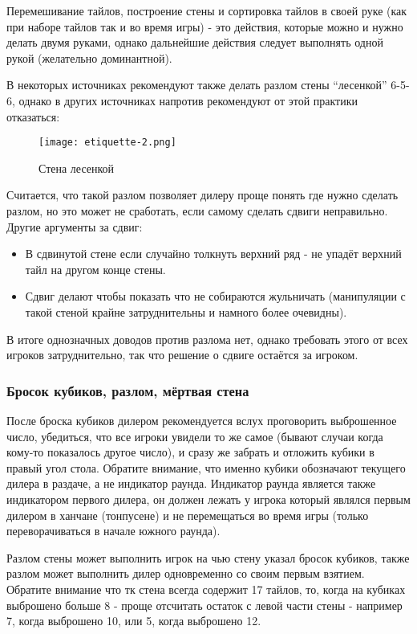 Перемешивание тайлов, построение стены и сортировка тайлов в своей руке (как при наборе тайлов так и во время игры) - это действия, которые можно и нужно делать двумя руками, однако дальнейшие действия следует выполнять одной рукой (желательно доминантной).

В некоторых источниках рекомендуют также делать разлом стены “лесенкой” 6-5-6, однако в других источниках напротив рекомендуют от этой практики отказаться:

\begin{figure}[H]
	\centering
	\texttt{[image: etiquette-2.png]}
	\caption{Стена лесенкой}
\end{figure}

Считается, что такой разлом позволяет дилеру проще понять где нужно сделать разлом, но это может не сработать, если самому сделать сдвиги неправильно. Другие аргументы за сдвиг:
\begin{itemize}
	\item В сдвинутой стене если случайно толкнуть верхний ряд - не упадёт верхний тайл на другом конце стены.
	\item Сдвиг делают чтобы показать что не собираются жульничать (манипуляции с такой стеной крайне затруднительны и намного более очевидны).
\end{itemize} 
В итоге однозначных доводов против разлома нет, однако требовать этого от всех игроков затруднительно, так что решение о сдвиге остаётся за игроком.

\subsubsection{Бросок кубиков, разлом, мёртвая стена}

После броска кубиков дилером рекомендуется вслух проговорить выброшенное число, убедиться, что все игроки увидели то же самое (бывают случаи когда кому-то показалось другое число), и сразу же забрать и отложить кубики в правый угол стола. Обратите внимание, что именно кубики обозначают текущего дилера в раздаче, а не индикатор раунда. Индикатор раунда является также индикатором первого дилера, он должен лежать у игрока который являлся первым дилером в ханчане (тонпусене) и не перемещаться во время игры (только переворачиваться в начале южного раунда). 

Разлом стены может выполнить игрок на чью стену указал бросок кубиков, также разлом может выполнить дилер одновременно со своим первым взятием. Обратите внимание что тк стена всегда содержит 17 тайлов, то, когда на кубиках выброшено больше 8 - проще отсчитать остаток с левой части стены - например 7, когда выброшено 10, или 5, когда выброшено 12. 

